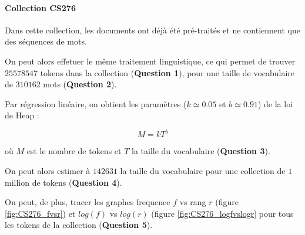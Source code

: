 \documentclass[12pt,a4paper]{article}
\begin{document}
\paragraph{Collection CS276} Dans cette collection, les documents ont déjà été pré-traités et ne contiennent que des séquences de mots.

On peut alors effetuer le même traitement linguistique, ce qui permet de trouver $25578547$ tokens dans la collection (\textbf{Question 1}), pour une taille de vocabulaire de $310162$ mots (\textbf{Question 2}).

Par régression linéaire, on obtient les paramètres ($k \simeq 0.05$ et $b \simeq 0.91$) de la loi de Heap :

\[ M =  kT^b \]

où $M$ est le nombre de tokens et $T$ la taille du vocabulaire (\textbf{Question 3}).

On peut alors estimer à $142631$ la taille du vocabulaire pour une collection de $1$ million de tokens (\textbf{Question 4}).

On peut, de plus, tracer les graphes frequence $f$ vs rang $r$ (figure \ref{fig:CS276_fvsr}) et $log(f)$ vs $log(r)$ (figure \ref{fig:CS276_logfvslogr} pour tous les tokens de la collection (\textbf{Question 5}).
\end{document}
